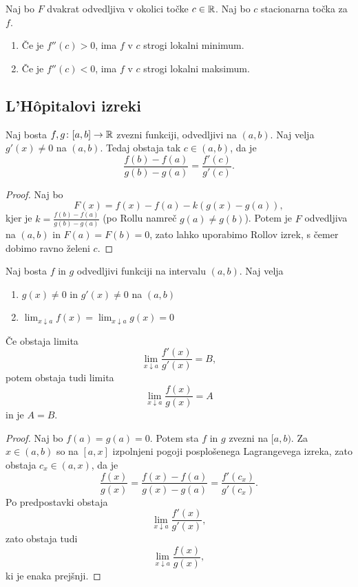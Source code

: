 \documentclass[12pt, a4paper]{article}
\begin{document}
\begin{posledica}
Naj bo $F$ dvakrat odvedljiva v okolici točke $c\in\mathbb{R}$. Naj bo $c$ stacionarna točka za $f$.

\begin{enumerate}[label=(\roman*)]
\item Če je $f''(c)>0$, ima $f$ v $c$ strogi lokalni minimum.
\item Če je $f''(c)<0$, ima $f$ v $c$ strogi lokalni maksimum.
\end{enumerate}
\end{posledica}

\obvs

\newpage

\subsection{L'Hôpitalovi izreki}

\begin{izrek}
Naj bosta $f,g\colon[a,b]\to\mathbb{R}$ zvezni funkciji, odvedljivi na $(a,b)$. Naj velja $g'(x)\ne 0$ na $(a,b)$. Tedaj obstaja tak $c\in(a,b)$, da je
\[
\frac{f(b)-f(a)}{g(b)-g(a)}=\frac{f'(c)}{g'(c)}.
\]
\end{izrek}

\begin{proof}
Naj bo
\[
F(x)=f(x)-f(a)-k(g(x)-g(a)),
\]
kjer je $k=\frac{f(b)-f(a)}{g(b)-g(a)}$ (po Rollu namreč $g(a)\ne g(b)$). Potem je $F$ odvedljiva na $(a,b)$ in $F(a)=F(b)=0$, zato lahko uporabimo Rollov izrek, s čemer dobimo ravno želeni $c$.
\end{proof}

\begin{izrek}[L'Hôpital]
Naj bosta $f$ in $g$ odvedljivi funkciji na intervalu $(a,b)$. Naj velja

\begin{enumerate}[label=\arabic*)]
\item $g(x)\ne 0$ in $g'(x)\ne 0$ na $(a,b)$
\item $\displaystyle\lim_{x\downarrow a}f(x)=\lim_{x\downarrow a}g(x)=0$
\end{enumerate}
Če obstaja limita
\[
\lim_{x\downarrow a}\frac{f'(x)}{g'(x)}=B,
\]
potem obstaja tudi limita
\[
\lim_{x\downarrow a}\frac{f(x)}{g(x)}=A
\]
in je $A=B$.
\end{izrek}

\begin{proof}
Naj bo $f(a)=g(a)=0$. Potem sta $f$ in $g$ zvezni na $[a,b)$. Za $x\in(a,b)$ so na $[a,x]$ izpolnjeni pogoji posplošenega Lagrangevega izreka, zato obstaja $c_x\in(a,x)$, da je
\[
\frac{f(x)}{g(x)}=\frac{f(x)-f(a)}{g(x)-g(a)}=\frac{f'(c_x)}{g'(c_x)}.
\]
Po predpostavki obstaja
\[
\lim_{x\downarrow a}\frac{f'(x)}{g'(x)},
\]
zato obstaja tudi
\[
\lim_{x\downarrow a}\frac{f(x)}{g(x)},
\]
ki je enaka prejšnji.
\end{proof}
\end{document}
